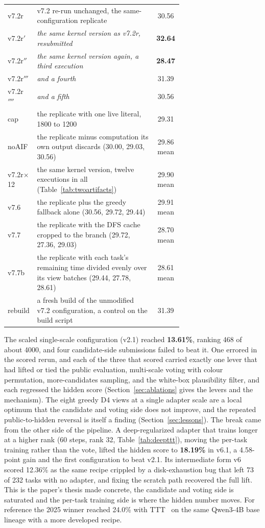\documentclass[11pt]{article}
\begin{document}
\begin{table}[tbp]
\begin{tabular}{@{}lp{0.68\linewidth}c@{}}
v7.2r & v7.2 re-run unchanged, the same-configuration replicate & 30.56 \\
v7.2r$'$ & \emph{the same kernel version as v7.2r, resubmitted} & \textbf{32.64} \\
v7.2r$''$ & \emph{the same kernel version again, a third execution} & \textbf{28.47} \\
v7.2r$'''$ & \emph{and a fourth} & 31.39 \\
v7.2r$''''$ & \emph{and a fifth} & 30.56 \\
cap & the replicate with one live literal, 1800 to 1200 & 29.31 \\
noAIF & the replicate minus computation its own output discards (30.00, 29.03, 30.56) & 29.86 mean \\
v7.2r$\times$12 & the same kernel version, twelve executions in all (Table~\ref{tab:twoartifacts}) & 29.90 mean \\
v7.6 & the replicate plus the greedy fallback alone (30.56, 29.72, 29.44) & 29.91 mean \\
v7.7 & the replicate with the DFS cache cropped to the branch (29.72, 27.36, 29.03) & 28.70 mean \\
v7.7b & the replicate with each task's remaining time divided evenly over its view batches (29.44, 27.78, 28.61) & 28.61 mean \\
rebuild & a fresh build of the unmodified v7.2 configuration, a control on the build script & 31.39 \\
\bottomrule
\end{tabular}
\end{table}

The scaled single-scale configuration (v2.1) reached \textbf{13.61\%}, ranking 468 of about 4000, and
four candidate-side submissions failed to beat it. One errored in the scored rerun, and each of the three that
scored carried exactly one lever that had lifted or tied the public evaluation, multi-scale voting
with colour permutation, more-candidates sampling, and the white-box plausibility filter, and each
regressed the hidden score (Section~\ref{sec:ablations} gives the levers and the mechanism). The eight
greedy D4 views at a single adapter scale are a local optimum that the candidate and voting side does
not improve, and the repeated public-to-hidden reversal is itself a finding (Section~\ref{sec:lessons}).
The break came from the other side of the pipeline. A deep-regularized adapter that trains longer at a
higher rank (60 steps, rank 32, Table~\ref{tab:deepttt}), moving the per-task training rather than the
vote, lifted the hidden score to \textbf{18.19\%} in v6.1, a 4.58-point gain and the first configuration
to beat v2.1. Its intermediate form v6 scored 12.36\% as the same recipe crippled by a disk-exhaustion
bug that left 73 of 232 tasks with no adapter, and fixing the scratch path recovered the full lift. This
is the paper's thesis made concrete, the candidate and voting side is saturated and the per-task training
side is where the hidden number moves. For reference the 2025 winner reached 24.0\% with TTT~\cite{arc2025} on the same Qwen3-4B base lineage
with a more developed recipe.
\end{document}
